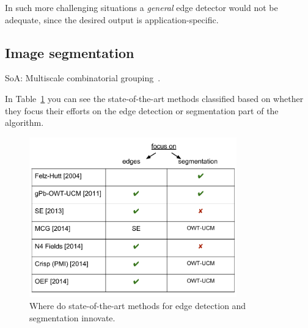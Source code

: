 In such more challenging situations a \textit{general} edge detector would not be adequate, since the desired output is application-specific.

\subsection{Image segmentation}

SoA: Multiscale combinatorial grouping~\cite{Arbelaez2014multiscale}.

In Table~\ref{fig:related_work_table} you can see the state-of-the-art methods classified based on whether they focus their efforts on the edge detection or segmentation part of the algorithm.

\begin{figure}[ht!]
\centering
\includegraphics[width=0.8\textwidth]{images/related_work_table.pdf} %
\caption[Related work: state of the art]{Where do state-of-the-art methods for edge detection and segmentation innovate.} %
\label{fig:related_work_table}
\end{figure}

